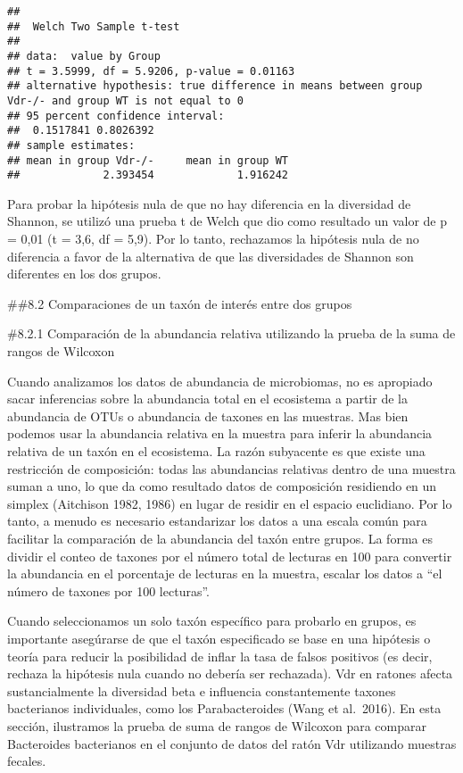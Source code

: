 \documentclass[
]{article}
\begin{document}
\begin{verbatim}
## 
##  Welch Two Sample t-test
## 
## data:  value by Group
## t = 3.5999, df = 5.9206, p-value = 0.01163
## alternative hypothesis: true difference in means between group Vdr-/- and group WT is not equal to 0
## 95 percent confidence interval:
##  0.1517841 0.8026392
## sample estimates:
## mean in group Vdr-/-     mean in group WT 
##             2.393454             1.916242
\end{verbatim}

Para probar la hipótesis nula de que no hay diferencia en la diversidad
de Shannon, se utilizó una prueba t de Welch que dio como resultado un
valor de p = 0,01 (t = 3,6, df = 5,9). Por lo tanto, rechazamos la
hipótesis nula de no diferencia a favor de la alternativa de que las
diversidades de Shannon son diferentes en los dos grupos.

\#\#8.2 Comparaciones de un taxón de interés entre dos grupos

\#8.2.1 Comparación de la abundancia relativa utilizando la prueba de la
suma de rangos de Wilcoxon

Cuando analizamos los datos de abundancia de microbiomas, no es
apropiado sacar inferencias sobre la abundancia total en el ecosistema a
partir de la abundancia de OTUs o abundancia de taxones en las muestras.
Mas bien podemos usar la abundancia relativa en la muestra para inferir
la abundancia relativa de un taxón en el ecosistema. La razón subyacente
es que existe una restricción de composición: todas las abundancias
relativas dentro de una muestra suman a uno, lo que da como resultado
datos de composición residiendo en un simplex (Aitchison 1982, 1986) en
lugar de residir en el espacio euclidiano. Por lo tanto, a menudo es
necesario estandarizar los datos a una escala común para facilitar la
comparación de la abundancia del taxón entre grupos. La forma es dividir
el conteo de taxones por el número total de lecturas en 100 para
convertir la abundancia en el porcentaje de lecturas en la muestra,
escalar los datos a ``el número de taxones por 100 lecturas''.

Cuando seleccionamos un solo taxón específico para probarlo en grupos,
es importante asegúrarse de que el taxón especificado se base en una
hipótesis o teoría para reducir la posibilidad de inflar la tasa de
falsos positivos (es decir, rechaza la hipótesis nula cuando no debería
ser rechazada). Vdr en ratones afecta sustancialmente la diversidad beta
e influencia constantemente taxones bacterianos individuales, como los
Parabacteroides (Wang et al.~2016). En esta sección, ilustramos la
prueba de suma de rangos de Wilcoxon para comparar Bacteroides
bacterianos en el conjunto de datos del ratón Vdr utilizando muestras
fecales.
\end{document}
